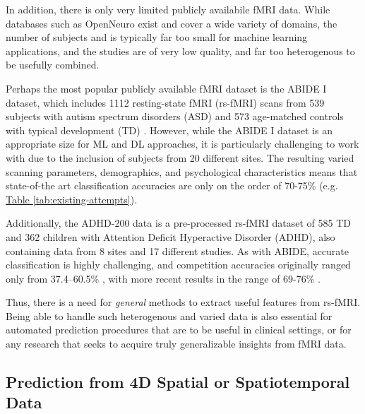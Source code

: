 \documentclass[10pt]{article}
\begin{document}
In addition, there is only very limited publicly availabile fMRI data. While databases such as
OpenNeuro \citep{markiewiczOpenNeuroOpenResource2021} exist and cover a wide variety of domains, the
number of subjects and is typically far too small for machine learning applications, and the studies
are of very  low quality, and far too heterogenous to be usefully combined.

Perhaps the most popular publicly available fMRI dataset is the ABIDE I dataset, which includes 1112
resting-state fMRI (rs-fMRI) scans from 539 subjects with autism spectrum disorders (ASD) and 573
age-matched controls with typical development (TD) \citep{dimartinoAutismBrainImaging2014}. However,
while the ABIDE I dataset is an appropriate size for ML and DL approaches, it is particularly
challenging to work with due to the inclusion of subjects from 20 different sites. The resulting
varied scanning parameters, demographics, and psychological characteristics means that state-of-the
art classification accuracies are only on the order of 70-75\% (e.g.
\hyperref[tab:existing-attempts]{Table \ref{tab:existing-attempts}}).

Additionally, the ADHD-200 data \citep{bellecNeuroBureauADHD2002017} is a pre-processed rs-fMRI
dataset of 585 TD and 362 children with Attention Deficit Hyperactive Disorder (ADHD), also
containing data from 8 sites and 17 different studies. As with ABIDE, accurate classification is
highly challenging, and competition accuracies originally ranged only from 37.4--60.5\%
\citep{milhamAdhd200ConsortiumModel2012}, with more recent results in the range of 69-76\%
\citep[see][for a brief review]{liuDeepSpatioTemporalRepresentation2021}.

Thus, there is a need for \emph{general} methods to extract useful features from rs-fMRI. Being able
to handle such heterogenous and varied data is also essential for automated prediction procedures that
are to be useful in clinical settings, or for any research that seeks to acquire truly generalizable
insights from fMRI data.

\subsection{Prediction from 4D Spatial or Spatiotemporal Data}

\end{document}
